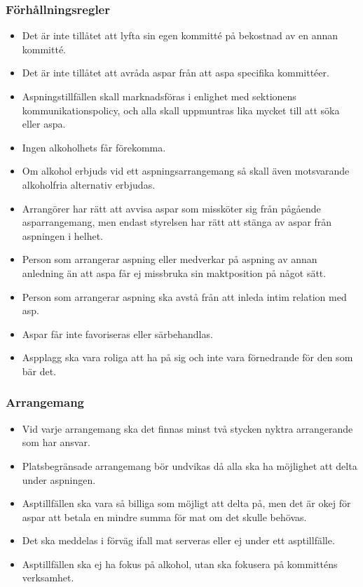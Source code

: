 \documentclass[a4paper]{dtek}
\begin{document}
\subsubsection{Förhållningsregler}
\begin{itemize}
    \item Det är inte tillåtet att lyfta sin egen kommitté på bekostnad av en annan kommitté. 
    \item Det är inte tillåtet att avråda aspar från att aspa specifika kommittéer. 
    \item Aspningstillfällen skall marknadsföras i enlighet med sektionens kommunikationspolicy, och alla skall uppmuntras lika mycket till att söka eller aspa.
    \item Ingen alkoholhets får förekomma. 
    \item Om alkohol erbjuds vid ett aspningsarrangemang så skall även motsvarande alkoholfria alternativ erbjudas.
    \item Arrangörer har rätt att avvisa aspar som missköter sig från pågående asparrangemang, men endast styrelsen har rätt att stänga av aspar från aspningen i helhet.
    \item Person som arrangerar aspning eller medverkar på aspning av annan anledning än att aspa får ej missbruka sin maktposition på något sätt.
    \item Person som arrangerar aspning ska avstå från att inleda intim relation med asp.
    \item Aspar får inte favoriseras eller särbehandlas.
    \item Aspplagg ska vara roliga att ha på sig och inte vara förnedrande för den som bär det. 
\end{itemize}
\subsubsection{Arrangemang}
\begin{itemize}
    \item Vid varje arrangemang ska det finnas minst två stycken nyktra arrangerande som har ansvar. 
    \item Platsbegränsade arrangemang bör undvikas då alla ska ha möjlighet att delta under aspningen.
    \item Asptillfällen ska vara så billiga som möjligt att delta på, men det är okej för aspar att betala en mindre summa för mat om det skulle behövas. 
    \item Det ska meddelas i förväg ifall mat serveras eller ej under ett asptillfälle. 
    \item Asptillfällen ska ej ha fokus på alkohol, utan ska fokusera på kommitténs verksamhet.
\end{itemize}
\end{document}
